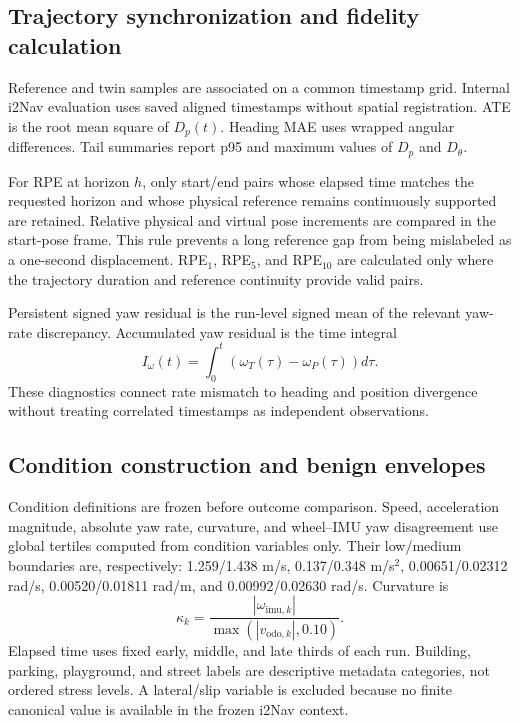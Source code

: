 \documentclass[journal,onecolumn]{IEEEtran}
\begin{document}
\subsection{Trajectory synchronization and fidelity calculation}
Reference and twin samples are associated on a common timestamp grid. Internal i2Nav evaluation uses saved aligned timestamps without spatial registration. ATE is the root mean square of $D_p(t)$. Heading MAE uses wrapped angular differences. Tail summaries report p95 and maximum values of $D_p$ and $D_\theta$.

For RPE at horizon $h$, only start/end pairs whose elapsed time matches the requested horizon and whose physical reference remains continuously supported are retained. Relative physical and virtual pose increments are compared in the start-pose frame. This rule prevents a long reference gap from being mislabeled as a one-second displacement. RPE$_1$, RPE$_5$, and RPE$_{10}$ are calculated only where the trajectory duration and reference continuity provide valid pairs.

Persistent signed yaw residual is the run-level signed mean of the relevant yaw-rate discrepancy. Accumulated yaw residual is the time integral
\begin{equation}
I_\omega(t)=\int_0^t\left(\omega_T(\tau)-\omega_P(\tau)\right)d\tau .
\end{equation}
These diagnostics connect rate mismatch to heading and position divergence without treating correlated timestamps as independent observations.

\subsection{Condition construction and benign envelopes}
Condition definitions are frozen before outcome comparison. Speed, acceleration magnitude, absolute yaw rate, curvature, and wheel--IMU yaw disagreement use global tertiles computed from condition variables only. Their low/medium boundaries are, respectively: 1.259/1.438 m/s, 0.137/0.348 m/s$^2$, 0.00651/0.02312 rad/s, 0.00520/0.01811 rad/m, and 0.00992/0.02630 rad/s. Curvature is
\begin{equation}
\kappa_k=\frac{|\omega_{\mathrm{imu},k}|}{\max(|v_{\mathrm{odo},k}|,0.10)}.
\end{equation}
Elapsed time uses fixed early, middle, and late thirds of each run. Building, parking, playground, and street labels are descriptive metadata categories, not ordered stress levels. A lateral/slip variable is excluded because no finite canonical value is available in the frozen i2Nav context.
\end{document}
